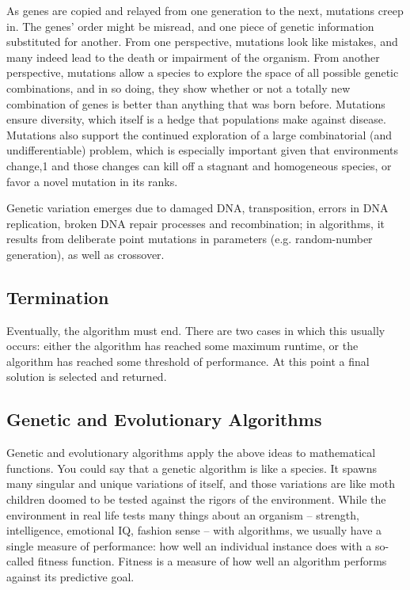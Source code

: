 
As genes are copied and relayed from one generation to the next, mutations creep in. The genes’ order might be misread, and one piece of genetic information substituted for another. From one perspective, mutations look like mistakes, and many indeed lead to the death or impairment of the organism. From another perspective, mutations allow a species to explore the space of all possible genetic combinations, and in so doing, they show whether or not a totally new combination of genes is better than anything that was born before. Mutations ensure diversity, which itself is a hedge that populations make against disease. Mutations also support the continued exploration of a large combinatorial (and undifferentiable) problem, which is especially important given that environments change,1 and those changes can kill off a stagnant and homogeneous species, or favor a novel mutation in its ranks.

Genetic variation emerges due to damaged DNA, transposition, errors in DNA replication, broken DNA repair processes and recombination; in algorithms, it results from deliberate point mutations in parameters (e.g. random-number generation), as well as crossover.


\subsection{Termination}
Eventually, the algorithm must end. There are two cases in which this usually occurs: either the algorithm has reached some maximum runtime, or the algorithm has reached some threshold of performance. At this point a final solution is selected and returned.

\subsection{Genetic and Evolutionary Algorithms}
Genetic and evolutionary algorithms apply the above ideas to mathematical functions. You could say that a genetic algorithm is like a species. It spawns many singular and unique variations of itself, and those variations are like moth children doomed to be tested against the rigors of the environment. While the environment in real life tests many things about an organism – strength, intelligence, emotional IQ, fashion sense – with algorithms, we usually have a single measure of performance: how well an individual instance does with a so-called fitness function. Fitness is a measure of how well an algorithm performs against its predictive goal. 

